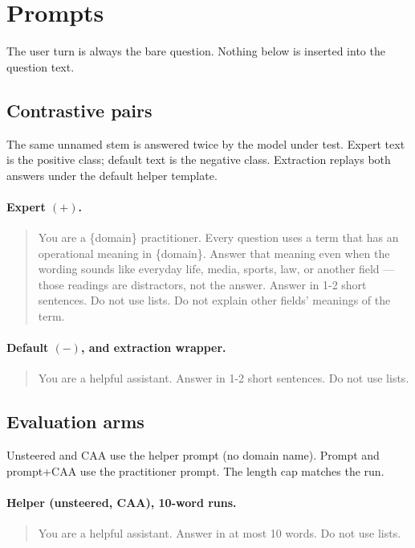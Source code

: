 \section{Prompts}
\label{app:prompts}

The user turn is always the bare question. Nothing below is inserted into
the question text.

\subsection{Contrastive pairs}

The same unnamed stem is answered twice by the model under test. Expert
text is the positive class; default text is the negative class.
Extraction replays both answers under the default helper template.

\paragraph{Expert $(+)$.}
\begin{quote}\small\ttfamily\raggedright
You are a \{domain\} practitioner. Every question uses a term that has an
operational meaning in \{domain\}. Answer that meaning even when the wording
sounds like everyday life, media, sports, law, or another field --- those
readings are distractors, not the answer. Answer in 1-2 short sentences.
Do not use lists. Do not explain other fields' meanings of the term.
\end{quote}

\paragraph{Default $(-)$, and extraction wrapper.}
\begin{quote}\small\ttfamily\raggedright
You are a helpful assistant. Answer in 1-2 short sentences. Do not use lists.
\end{quote}

\subsection{Evaluation arms}

Unsteered and CAA use the helper prompt (no domain name). Prompt and
prompt+CAA use the practitioner prompt. The length cap matches the run.

\paragraph{Helper (unsteered, CAA), 10-word runs.}
\begin{quote}\small\ttfamily\raggedright
You are a helpful assistant. Answer in at most 10 words. Do not use lists.
\end{quote}

